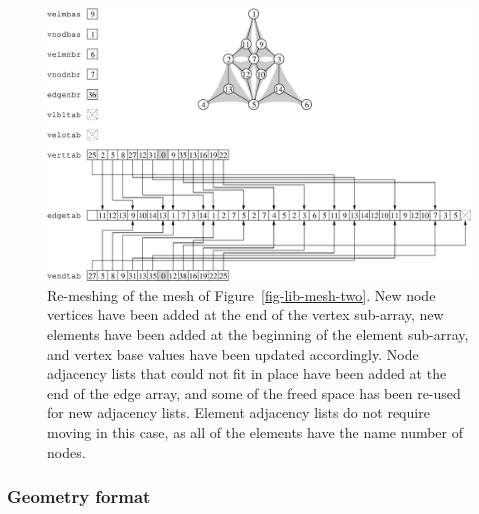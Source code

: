\begin{figure}
\centering\includegraphics[scale=0.47]{s_f_me3.eps}
\caption{Re-meshing of the mesh of Figure~\protect\ref{fig-lib-mesh-two}.
New node vertices have been added at the end of the vertex sub-array,
new elements have been added at the beginning of the element sub-array,
and vertex base values have been updated accordingly. Node adjacency
lists that could not fit in place have been added at the end of the edge
array, and some of the freed space has been re-used for new adjacency
lists. Element adjacency lists do not require moving in this case, as
all of the elements have the name number of nodes.}
\label{fig-lib-mesh-three}
\end{figure}

\subsubsection{Geometry format}
\label{sec-lib-format-geom}

